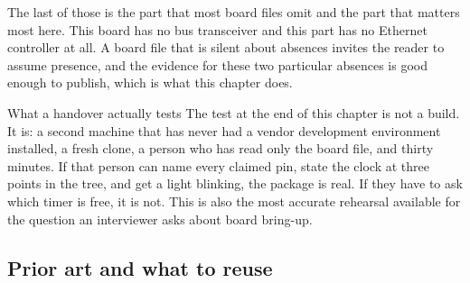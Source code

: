 The last of those is the part that most board files omit and the part that
matters most here. This board has no bus transceiver and this part has no
Ethernet controller at all. A board file that is silent about absences invites
the reader to assume presence, and the evidence for these two particular
absences is good enough to publish, which is what this chapter does.

\begin{note}{What a handover actually tests}
The test at the end of this chapter is not a build. It is: a second machine
that has never had a vendor development environment installed, a fresh clone, a
person who has read only the board file, and thirty minutes. If that person can
name every claimed pin, state the clock at three points in the tree, and get a
light blinking, the package is real. If they have to ask which timer is free,
it is not. This is also the most accurate rehearsal available for the question
an interviewer asks about board bring-up.
\end{note}

\subsection*{Prior art and what to reuse}

